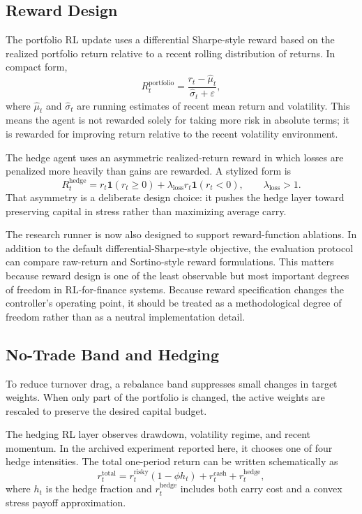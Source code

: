 \documentclass[11pt]{article}
\begin{document}
\subsection{Reward Design}

The portfolio RL update uses a differential Sharpe-style reward based on the
realized portfolio return relative to a recent rolling distribution of returns.
In compact form,
\[
R_t^{\mathrm{portfolio}}
= \frac{r_t - \hat{\mu}_t}{\hat{\sigma}_t + \varepsilon},
\]
where $\hat{\mu}_t$ and $\hat{\sigma}_t$ are running estimates of recent mean
return and volatility. This means the agent is not rewarded solely for taking
more risk in absolute terms; it is rewarded for improving return relative to
the recent volatility environment.

The hedge agent uses an asymmetric realized-return reward in which losses are
penalized more heavily than gains are rewarded. A stylized form is
\[
R_t^{\mathrm{hedge}}
= r_t \mathbf{1}(r_t \ge 0)
 + \lambda_{\mathrm{loss}} r_t \mathbf{1}(r_t < 0),
\qquad \lambda_{\mathrm{loss}} > 1.
\]
That asymmetry is a deliberate design choice: it pushes the hedge layer toward
preserving capital in stress rather than maximizing average carry.

The research runner is now also designed to support reward-function ablations.
In addition to the default differential-Sharpe-style objective, the evaluation
protocol can compare raw-return and Sortino-style reward formulations. This
matters because reward design is one of the least observable but most important
degrees of freedom in RL-for-finance systems.
Because reward specification changes the controller's operating point, it should
be treated as a methodological degree of freedom rather than as a neutral
implementation detail.

\subsection{No-Trade Band and Hedging}

To reduce turnover drag, a rebalance band suppresses small changes in target
weights. When only part of the portfolio is changed, the active weights are
rescaled to preserve the desired capital budget.

The hedging RL layer observes drawdown, volatility regime, and recent momentum.
In the archived experiment reported here, it chooses one of four hedge
intensities. The total one-period return can be
written schematically as
\[
r_t^{\text{total}} =
r_t^{\text{risky}}(1-\phi h_t) + r_t^{\text{cash}} + r_t^{\text{hedge}},
\]
where $h_t$ is the hedge fraction and $r_t^{\text{hedge}}$ includes both carry
cost and a convex stress payoff approximation.
\end{document}
